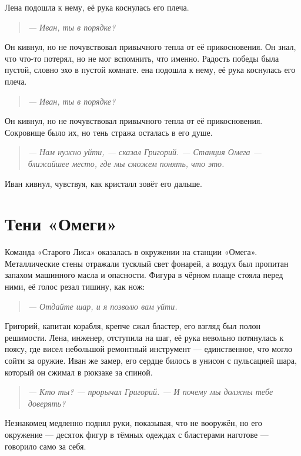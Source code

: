 \documentclass[12pt,a4paper]{book}
\newenvironment{dialogue}{\begin{quote}\itshape}{\end{quote}}
\begin{document}
Лена подошла к нему, её рука коснулась его плеча.

\begin{dialogue}
--- Иван, ты в порядке?
\end{dialogue}

Он кивнул, но не почувствовал привычного тепла от её прикосновения. Он знал, что что-то потерял, но не мог вспомнить, что именно. Радость победы была пустой, словно эхо в пустой комнате.
ена подошла к нему, её рука коснулась его плеча.

\begin{dialogue}
--- Иван, ты в порядке?
\end{dialogue}

Он кивнул, но не почувствовал привычного тепла от её прикосновения. Сокровище было их, но тень стража осталась в его душе.

\begin{dialogue}
--- Нам нужно уйти, --- сказал Григорий. --- Станция Омега --- ближайшее место, где мы сможем понять, что это.
\end{dialogue}

Иван кивнул, чувствуя, как кристалл зовёт его дальше.

\chapter{Тени «Омеги»}

Команда «Старого Лиса» оказалась в окружении на станции «Омега». Металлические стены отражали тусклый свет фонарей, а воздух был пропитан запахом машинного масла и опасности. Фигура в чёрном плаще стояла перед ними, её голос резал тишину, как нож:

\begin{dialogue}
--- Отдайте шар, и я позволю вам уйти.
\end{dialogue}

Григорий, капитан корабля, крепче сжал бластер, его взгляд был полон решимости. Лена, инженер, отступила на шаг, её рука невольно потянулась к поясу, где висел небольшой ремонтный инструмент --- единственное, что могло сойти за оружие. Иван же замер, его сердце билось в унисон с пульсацией шара, который он сжимал в рюкзаке за спиной.

\begin{dialogue}
--- Кто ты? --- прорычал Григорий. --- И почему мы должны тебе доверять?
\end{dialogue}

Незнакомец медленно поднял руки, показывая, что не вооружён, но его окружение --- десяток фигур в тёмных одеждах с бластерами наготове --- говорило само за себя.
\end{document}
